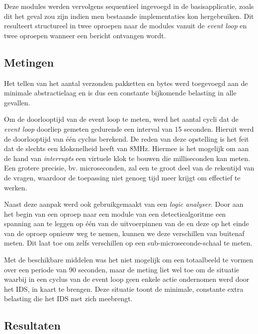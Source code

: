 Deze modules werden vervolgens sequentieel ingevoegd in de basisapplicatie,
zoals dit het geval zou zijn indien men bestaande implementaties kon
hergebruiken. Dit resulteert structureel in twee oproepen naar de modules
vanuit de \emph{event loop} en twee oproepen wanneer een bericht ontvangen
wordt.

\vspace{-3mm}

\subsection{Metingen}

Het tellen van het aantal verzonden pakketten en bytes werd toegevoegd aan de
minimale abstractielaag en is dus een constante bijkomende belasting in alle
gevallen.

Om de doorlooptijd van de event loop te meten, werd het aantal cycli dat de
\emph{event loop} doorliep gemeten gedurende een interval van 15 seconden.
Hieruit werd de doorlooptijd van \'e\'en cyclus berekend. De reden van deze
opstelling is het feit dat de \mcu slechts een kloksnelheid heeft van 8MHz.
Hiermee is het mogelijk om aan de hand van \emph{interrupts} een virtuele klok
te bouwen die milliseconden kan meten. Een grotere precisie, bv. microseconden,
zal een te groot deel van de rekentijd van de \mcu vragen, waardoor de
toepassing niet genoeg tijd meer krijgt om effectief te werken.

Naast deze aanpak werd ook gebruikgemaakt van een \emph{logic analyser}. Door
aan het begin van een oproep naar een module van een detectiealgoritme een
spanning aan te leggen op \'e\'en van de uitvoerpinnen van de \mcu en deze op
het einde van de oproep opnieuw weg te nemen, kunnen we deze verschillen van
buitenaf meten. Dit laat toe om zelfs verschillen op een
sub-microseconde-schaal te meten.

Met de beschikbare middelen was het niet mogelijk om een totaalbeeld te vormen
over een periode van 90 seconden, maar de meting liet wel toe om de situatie
waarbij in een cyclus van de event loop geen enkele actie ondernomen werd door
het IDS, in kaart te brengen. Deze situatie toont de minimale, constante extra
belasting die het IDS met zich meebrengt.

\vspace{-3mm}

\subsection{Resultaten}


